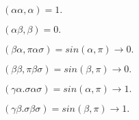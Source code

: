 


$( \alpha\alpha,  \alpha ) = 1.$

$( \alpha\beta,  \beta ) = 0.$

$( \beta\alpha,  \pi\alpha\sigma ) = sin ( \alpha, \pi ) \rightarrow 0.$

$( \beta\beta,  \pi\beta\sigma ) = sin ( \beta, \pi ) \rightarrow 0.$

$( \gamma\alpha.  \sigma\alpha\sigma ) = sin ( \alpha, \pi ) \rightarrow 1.$

$( \gamma\beta.  \sigma\beta\sigma ) = sin ( \beta, \pi ) \rightarrow 1.$


\bye
